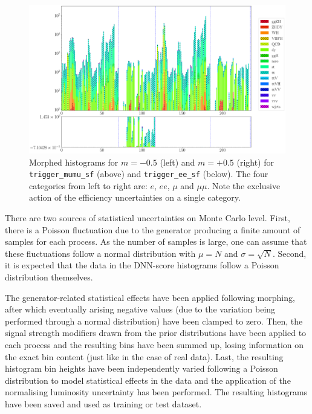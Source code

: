 \begin{figure}[h!]
\begin{minipage}{.5\textwidth}
		\includegraphics[width=\linewidth]{figures/network_setup/trigger_ee_sf_+0.5}
	\end{minipage}
	\caption{Morphed histograms for $m = -0.5$ (left) and $m = +0.5$ (right) for \texttt{trigger\_mumu\_sf} (above) and \texttt{trigger\_ee\_sf} (below). The four categories from left to right are: $e$, $ee$, $\mu$ and $\mu\mu$. Note the exclusive action of the efficiency uncertainties on a single category.}
	\label{fig:trigger_sf}
\end{figure}

\Subsection{\textcolor{red}{Statistical Uncertainties}}

There are two sources of statistical uncertainties on Monte Carlo level. First, there is a Poisson fluctuation due to the generator producing a finite amount of samples for each process. As the number of samples is large, one can assume that these fluctuations follow a normal distribution with $\mu = N$ and $\sigma = \sqrt{N}$. Second, it is expected that the data in the DNN-score histograms follow a Poisson distribution themselves.

The generator-related statistical effects have been applied following morphing, after which eventually arising negative values (due to the variation being performed through a normal distribution) have been clamped to zero. Then, the signal strength modifiers drawn from the prior distributions have been applied to each process and the resulting bins have been summed up, losing information on the exact bin content (just like in the case of real data). Last, the resulting histogram bin heights have been independently varied following a Poisson distribution to model statistical effects in the data and the application of the normalising luminosity uncertainty has been performed. The resulting histograms have been saved and used as training or test dataset.

